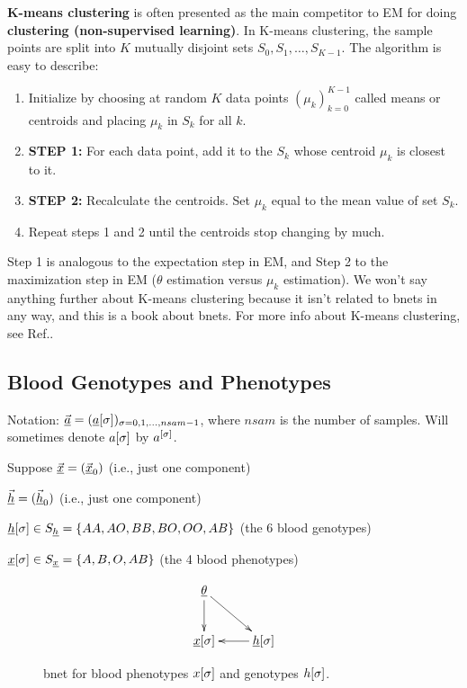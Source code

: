 {\bf K-means clustering} is often
presented as the main competitor
to EM for doing 
{\bf clustering (non-supervised
learning)}. In K-means clustering,
the sample points are 
split into $K$
mutually
disjoint sets $S_0, S_1, \ldots, S_{K-1}$. 
The algorithm is easy
to describe:
\begin{enumerate}
\item
Initialize by 
choosing  at random
$K$ data points $(\mu_k)_{k=0}^{K-1}$
called means or centroids
and placing $\mu_k$ in $S_k$
for all $k$.
 \item {\bf STEP 1:}
For each data point,
add it to the $S_k$
whose centroid $\mu_k$
is closest to it.
\item {\bf STEP 2:}
Recalculate the centroids.
Set $\mu_k$ equal to the mean value of set
$S_k$.
\item Repeat steps 1 and 2 until the
centroids stop changing 
by much.
\end{enumerate}
Step 1 is analogous
to the expectation step in EM,
and Step 2 to the maximization
step in EM ($\theta$
estimation versus 
$\mu_k$ estimation).
We won't say anything further
about K-means clustering because
it
isn't related to bnets in any 
way, and this is a book about bnets.
For more info about
K-means clustering, 
see Ref.\cite{wiki-k-means}.

\subsection{Blood Genotypes 
and Phenotypes}

Notation:
$\vec{{\underline{a}}}=
({\underline{a}}[\sigma])_{\sigma=0, 1, \ldots,nsam-1}
$, where $nsam$
is the number of samples.
Will
sometimes
denote
$a{[\sigma]}$ by $a^{[\sigma]}$.


Suppose
$\vec{{\underline{x}}}=
(\vec{{\underline{x}}}_0)
$ (i.e., just one component)

$\vec{{\underline{h}}}=
(\vec{{\underline{h}}}_0)
$ (i.e., just one component)



${\underline{h}}[\sigma]\in S_{\underline{h}}=
\{AA, AO, BB, BO, OO, AB\}$ (the 6 blood genotypes)

${\underline{x}}[\sigma]\in S_{\underline{x}}=
\{A,B,O,AB\}$ (the 4 blood phenotypes)

\begin{figure}[h!]
$$
\xymatrix{
\ul{\theta}\ar[d]\ar[dr]
\\
\rvx[\sigma]&\rvh[\sigma]\ar[l]
}$$
\caption{bnet 
for blood phenotypes $x{[\sigma]}$
and genotypes $h{[\sigma]}$.}
\label{fig-phenotypes}
\end{figure}


